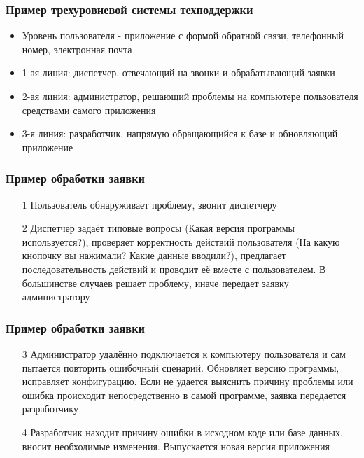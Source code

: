 \documentclass{../industrial-development}
\begin{document}
\begin{frame} \frametitle{Пример трехуровневой системы техподдержки}
    \begin{itemize}
        \item Уровень пользователя - приложение с формой обратной связи, телефонный номер, электронная почта
        \item 1-ая линия: диспетчер, отвечающий на звонки и обрабатывающий заявки
        \item 2-ая линия: администратор, решающий проблемы на компьютере пользователя средствами самого приложения
        \item 3-я линия: разработчик, напрямую обращающийся к базе и обновляющий приложение
    \end{itemize}
\end{frame}
\lecturenotes


\begin{frame} \frametitle{Пример обработки заявки} 
    \begin{enumerate}
        \item[1] Пользователь обнаруживает проблему, звонит диспетчеру
        \item[2] Диспетчер задаёт типовые вопросы (Какая версия программы используется?), проверяет корректность действий пользователя (На какую кнопочку вы нажимали? Какие данные вводили?), предлагает последовательность действий и проводит её вместе с пользователем. В большинстве случаев решает проблему, иначе передает заявку администратору
    \end{enumerate}
\end{frame}
\lecturenotes

\begin{frame} \frametitle{Пример обработки заявки} 
    \begin{enumerate}
        \item[3] Администратор удалённо подключается к компьютеру пользователя и сам пытается повторить ошибочный сценарий. Обновляет версию программы, исправляет конфигурацию. Если не удается выяснить причину проблемы или ошибка происходит непосредственно в самой программе, заявка передается разработчику
        \item[4] Разработчик находит причину ошибки в исходном коде или базе данных, вносит необходимые изменения. Выпускается новая версия приложения
    \end{enumerate}
\end{frame}
\lecturenotes
\end{document}
